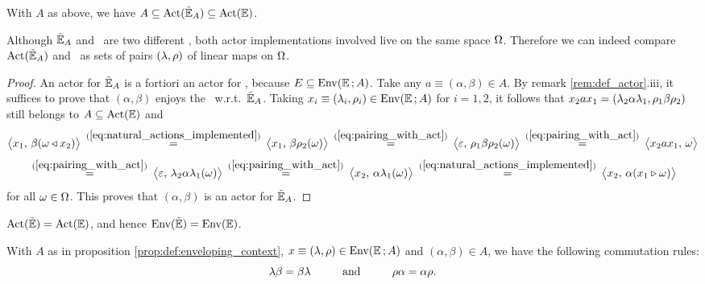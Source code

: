 \begin{prop_sec} \label{prop:EnvEnv_is_Env}
 With\/ $A$ as above, we have\/ $A \subseteq \mbox{\rm Act}(\tilde{\mathbb{E}}_A) \subseteq \mbox{\rm Act}(\mathbb{E})$.
\end{prop_sec}

\begin{remark_sec} \label{rem:compare_sets_of_actors} \rm
  Although $\tilde{\mathbb{E}}_A$ and \EE\ are two different \contexts,
  both actor implementations involved live on the same space $\Omega$.
  Therefore we can indeed compare $\mbox{\rm Act}(\tilde{\mathbb{E}}_A)$ and \ActE\
  as sets of pairs $(\lambda,\rho)$ of linear maps on $\Omega$.
\end{remark_sec}

\begin{proof}
   An actor for $\tilde{\mathbb{E}}_A$ is a fortiori an actor for \EE,
   because $E\subseteq {\rm Env}(\mathbb{E}\,;A)$\@.
   Take any $a\equiv(\alpha,\beta)\in A$.
   By remark \ref{rem:def_actor}.iii, it suffices to prove
   that $(\alpha,\beta)$ enjoys the \biap\ w.r.t.\ $\tilde{\mathbb{E}}_A$.
   Taking $x_i\equiv(\lambda_i,\rho_i)\in {\rm Env}(\mathbb{E}\,;A)$ for $i=1,2$,
   it follows that $x_2 a x_1 = (\lambda_2\alpha\lambda_1, \rho_1\beta\rho_2)$
   still belongs to $A\subseteq \mbox{\rm Act}(\mathbb{E})$ and
   $$         \pairM{x_1}{\beta(\om \ract x_2)}
     \:\stackrel{\rm (\ref{eq:natural_actions_implemented})}{=}\:
              \pairM{x_1}{\beta\rho_2(\om)}
     \:\stackrel{\rm (\ref{eq:pairing_with_act})}{=}\:
              \pairM{\eps}{\rho_1\beta\rho_2(\om)}
     \:\stackrel{\rm (\ref{eq:pairing_with_act})}{=}\:
              \pairM{x_2 a x_1}{\om}  $$
   $$ \:\stackrel{\rm (\ref{eq:pairing_with_act})}{=}\:
              \pairM{\eps}{\lam_2\alpha\lam_1(\om)}
      \:\stackrel{\rm (\ref{eq:pairing_with_act})}{=}\:
              \pairM{x_2}{\alpha\lam_1(\om)}
      \:\stackrel{\rm (\ref{eq:natural_actions_implemented})}{=}\:
              \pairM{x_2}{\alpha(x_1 \lact \om)} $$
   for all $\omega \in \Omega$.
   This proves that $(\alpha,\beta)$ is an actor for $\tilde{\mathbb{E}}_A$.
\end{proof}


\begin{cor_sec} \label{cor:EnvEnv_is_Env}
   $\mbox{\rm Act}(\tilde{\mathbb{E}}) = \mbox{\rm Act}(\mathbb{E})$, and hence\/ $\mbox{\rm Env}(\tilde{\mathbb{E}}) = \mbox{\rm Env}(\mathbb{E})$.
\end{cor_sec}


\begin{cor_sec} \label{cor:lamrho_commutation}
  With $A$ as in proposition \ref{prop:def:enveloping_context},
  $x\equiv(\lambda,\rho) \in {\rm Env}(\mathbb{E}\,;A)$ and\/ $(\alpha,\beta) \in A$,
  we have the following commutation rules:
  \begin{equation} \label{eq:lamrho_commutation}
     \lam\beta  = \beta \lam   \andspace{10mm}
     \rho\alpha = \alpha\rho.
  \end{equation}
\end{cor_sec}

